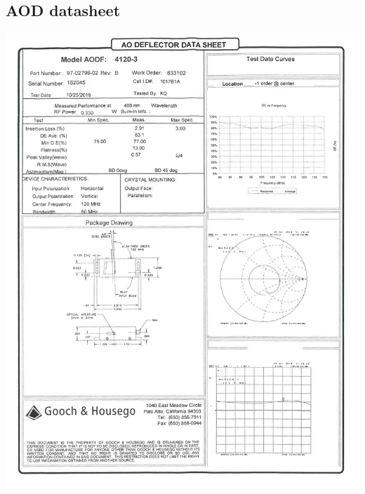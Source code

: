 \documentclass[english, a4paper, 12pt, twoside]{book}
\numberwithin{equation}{section} %
\begin{document}
\begin{appendices}
\chapter{AOD datasheet}
\label{sec:aoddata}
\thispagestyle{empty}
\includegraphics[scale=0.75]{AOD1}



\end{appendices}
\end{document}
